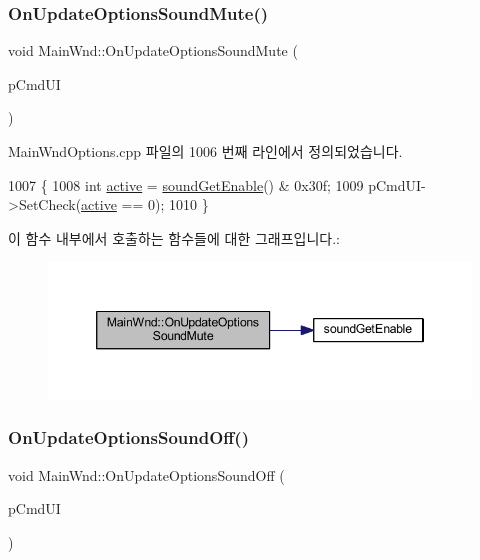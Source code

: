 \subsubsection{\texorpdfstring{On\+Update\+Options\+Sound\+Mute()}{OnUpdateOptionsSoundMute()}}
{\footnotesize\ttfamily void Main\+Wnd\+::\+On\+Update\+Options\+Sound\+Mute (\begin{DoxyParamCaption}\item[{C\+Cmd\+UI $\ast$}]{p\+Cmd\+UI }\end{DoxyParamCaption})\hspace{0.3cm}{\ttfamily [protected]}}



Main\+Wnd\+Options.\+cpp 파일의 1006 번째 라인에서 정의되었습니다.


\begin{DoxyCode}
1007 \{
1008   \textcolor{keywordtype}{int} \mbox{\hyperlink{_s_d_l_8cpp_aa5805c5e936174e5092bf7a5b78e7e64}{active}} = \mbox{\hyperlink{_sound_8cpp_a3d1f6129176583804274bb162c3428a8}{soundGetEnable}}() & 0x30f;
1009   pCmdUI->SetCheck(\mbox{\hyperlink{_s_d_l_8cpp_aa5805c5e936174e5092bf7a5b78e7e64}{active}} == 0);
1010 \}
\end{DoxyCode}
이 함수 내부에서 호출하는 함수들에 대한 그래프입니다.\+:
\nopagebreak
\begin{figure}[H]
\begin{center}
\leavevmode
\includegraphics[width=346pt]{class_main_wnd_a63964846dcc81703c9041f4b4c6d92c2_cgraph}
\end{center}
\end{figure}
\mbox{\label{class_main_wnd_a5c80e54eef1bc1e6cd6d00f2c196c2c0}} 
\subsubsection{\texorpdfstring{On\+Update\+Options\+Sound\+Off()}{OnUpdateOptionsSoundOff()}}
{\footnotesize\ttfamily void Main\+Wnd\+::\+On\+Update\+Options\+Sound\+Off (\begin{DoxyParamCaption}\item[{C\+Cmd\+UI $\ast$}]{p\+Cmd\+UI }\end{DoxyParamCaption})\hspace{0.3cm}{\ttfamily [protected]}}



